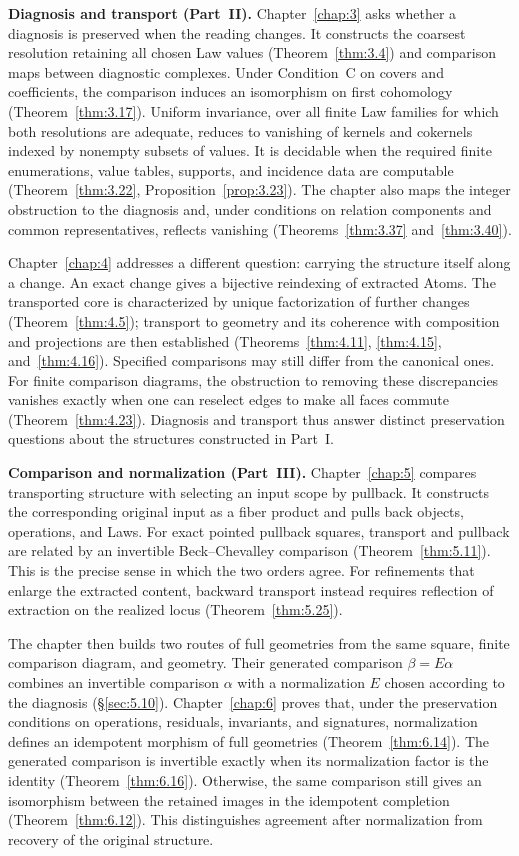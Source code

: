 \textbf{Diagnosis and transport (Part~II).}
Chapter~\ref{chap:3} asks whether a diagnosis is preserved when the reading
changes. It constructs the coarsest resolution retaining all chosen Law
values (Theorem~\ref{thm:3.4}) and comparison maps between diagnostic
complexes. Under Condition~C on covers and coefficients, the comparison
induces an isomorphism on first cohomology (Theorem~\ref{thm:3.17}). Uniform
invariance, over all finite Law families for which both resolutions are
adequate, reduces to vanishing of kernels and cokernels indexed by nonempty
subsets of values. It is decidable when the required finite enumerations,
value tables, supports, and incidence data are computable
(Theorem~\ref{thm:3.22}, Proposition~\ref{prop:3.23}). The chapter also maps
the integer obstruction to the diagnosis and, under conditions on relation
components and common representatives, reflects vanishing
(Theorems~\ref{thm:3.37} and~\ref{thm:3.40}).

Chapter~\ref{chap:4} addresses a different question: carrying the structure
itself along a change. An exact change gives a bijective reindexing of
extracted Atoms. The transported core is characterized by unique
factorization of further changes (Theorem~\ref{thm:4.5}); transport to
geometry and its coherence with composition and projections are then
established (Theorems~\ref{thm:4.11}, \ref{thm:4.15}, and~\ref{thm:4.16}).
Specified comparisons may still differ from the canonical ones. For finite
comparison diagrams, the obstruction to removing these discrepancies
vanishes exactly when one can reselect edges to make all faces commute
(Theorem~\ref{thm:4.23}). Diagnosis and transport thus answer distinct
preservation questions about the structures constructed in Part~I.

\textbf{Comparison and normalization (Part~III).}
Chapter~\ref{chap:5} compares transporting structure with selecting an input
scope by pullback. It constructs the corresponding original input as a fiber
product and pulls back objects, operations, and Laws. For exact pointed
pullback squares, transport and pullback are related by an invertible
Beck--Chevalley comparison (Theorem~\ref{thm:5.11}). This is the precise
sense in which the two orders agree. For refinements that enlarge the
extracted content, backward transport instead requires reflection of
extraction on the realized locus (Theorem~\ref{thm:5.25}).

The chapter then builds two routes of full geometries from the same square,
finite comparison diagram, and geometry. Their generated comparison
$\beta=E\alpha$ combines an invertible comparison $\alpha$ with a
normalization $E$ chosen according to the diagnosis (\S\ref{sec:5.10}).
Chapter~\ref{chap:6} proves that, under the preservation conditions on
operations, residuals, invariants, and signatures, normalization defines an
idempotent morphism of full geometries (Theorem~\ref{thm:6.14}). The generated
comparison is invertible exactly when its normalization factor is the
identity (Theorem~\ref{thm:6.16}). Otherwise, the same comparison still gives
an isomorphism between the retained images in the idempotent completion
(Theorem~\ref{thm:6.12}). This distinguishes agreement after normalization
from recovery of the original structure.

